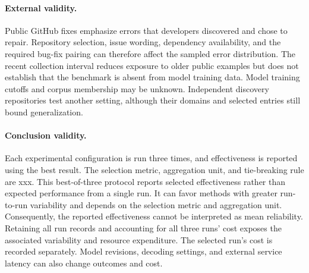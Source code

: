 \paragraph{External validity.}
Public GitHub fixes emphasize errors that developers discovered and chose
to repair. Repository selection, issue wording, dependency availability,
and the required bug-fix pairing can therefore affect the sampled error
distribution. The recent collection interval reduces exposure to older
public examples but does not establish that the benchmark is absent from
model training data. Model training cutoffs and corpus membership may be
unknown. Independent discovery repositories test another setting, although
their domains and selected entries still bound generalization.

\paragraph{Conclusion validity.}
Each experimental configuration is run three times, and effectiveness
is reported using the best result. The selection metric, aggregation unit,
and tie-breaking rule are xxx. This best-of-three protocol reports selected
effectiveness rather than expected performance from a single run. It can favor methods with greater
run-to-run variability and depends on the selection metric and aggregation
unit. Consequently, the reported effectiveness cannot be interpreted as
mean reliability. Retaining all run records and accounting for all three
runs' cost exposes the associated variability and resource expenditure.
The selected run's cost is recorded separately.
Model revisions, decoding settings, and external service latency can also
change outcomes and cost.
